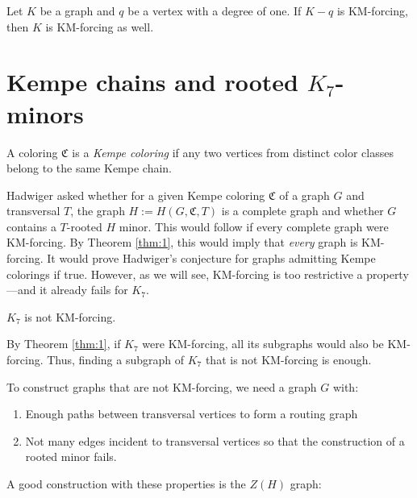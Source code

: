 \begin{thm}
\label{thm:2}
 Let $K$ be a graph and $q$ be a vertex with a degree of one. If $K - q$ is KM-forcing, then $K$ is KM-forcing as well.
\end{thm}


\section{Kempe chains and rooted $K_7$-minors}

\begin{defn}
 A coloring $\mathfrak{C}$ is a \textit{Kempe coloring} if any two vertices from distinct color classes belong 
 to the same Kempe chain. 
\end{defn}

Hadwiger \cite{hadwiger_1943} asked whether for a given Kempe coloring $\mathfrak{C}$ of a graph $G$ and transversal $T$, the graph $H:= H(G, \mathfrak{C}, T)$ is a complete graph 
and whether $G$ contains a $T$-rooted $H$ minor. This would follow if every complete graph were KM-forcing. 
By Theorem \ref{thm:1}, this would imply that \textit{every} graph is KM-forcing. 
It would prove Hadwiger's conjecture for graphs admitting Kempe colorings if true. 
However, as we will see, KM-forcing is too restrictive a property—and it already fails for $K_7$.

\begin{thm}\label{thm:3}
$K_7$ is not KM-forcing.
\end{thm}

By Theorem \ref{thm:1}, if $K_7$ were KM-forcing, all its subgraphs would also be KM-forcing. Thus, finding a subgraph of $K_7$ that is not KM-forcing is enough.

To construct graphs that are not KM-forcing, we need a graph $G$ with:
\begin{enumerate}
\item Enough paths between transversal vertices to form a routing graph
\item Not many edges incident to transversal vertices so that the construction of a rooted minor fails.
\end{enumerate}

A good construction with these properties is the \textit{$Z(H)$} graph:

